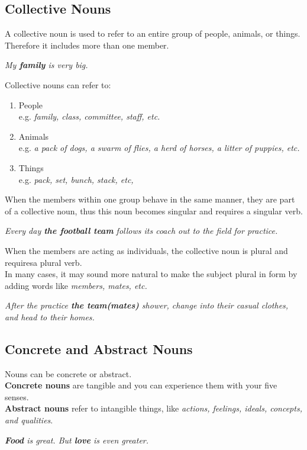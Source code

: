 \documentclass[10pt,a4paper]{article}
\begin{document}
\subsection{Collective Nouns}
A collective noun is used to refer to an entire group of people, animals, or things.\\
Therefore it includes more than one member.

\begin{center}
		\textit{My \textbf{family} is very big.}
\end{center}
\newpage
Collective nouns can refer to:
\begin{enumerate}[label=\alph*)]
		\item People\\
				e.g. \textit{family, class, committee, staff, etc.}
		\item Animals\\
				e.g. \textit{a pack of dogs, a swarm of flies, a herd of horses, a litter of puppies, etc.}
		\item Things\\
				e.g. \textit{pack, set, bunch, stack, etc,}
\end{enumerate}
When the members within one group behave in the same manner, they are part of a collective noun, thus this noun becomes singular and requires a singular verb.
\begin{center}
		\textit{Every day \textbf{the football team} follows its coach out to the field for practice.}
\end{center}

When the members are acting as individuals, the collective noun is plural and requiresa plural verb.\\
In many cases, it may sound more natural to make the subject plural in form by adding words like \textit{members, mates, etc.}
\begin{center}
		\textit{After the practice \textbf{the team(mates)} shower, change into their casual clothes, and head to their homes.}
\end{center}

\subsection{Concrete and Abstract Nouns}
\hspace{0.8cm} Nouns can be concrete or abstract. \\
\textbf{Concrete nouns} are tangible and you can experience them with your five senses.\\
\textbf{Abstract nouns} refer to intangible things, like \textit{actions, feelings, ideals, concepts, and qualities}.
\begin{center}
		\textit{ \textbf{Food} is great. But \textbf{love} is even greater.}
\end{center}
\end{document}
